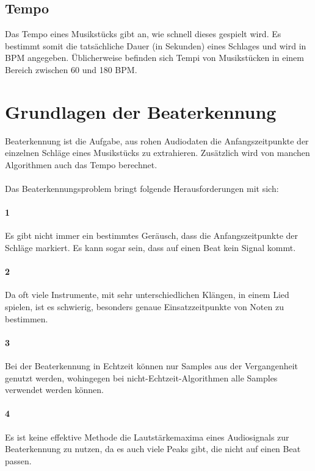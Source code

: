 {	\subsection{Tempo}
	{
		Das Tempo eines Musikstücks gibt an,
			wie schnell dieses gespielt wird.
		Es bestimmt somit die tatsächliche Dauer (in Sekunden) eines Schlages
			und wird in \ac{BPM} angegeben.
		Üblicherweise befinden sich Tempi von Musikstücken in einem Bereich zwischen 60 und 180 \ac{BPM}.
	}
}

\section{Grundlagen der Beaterkennung}
{
	Beaterkennung ist die Aufgabe,
		aus rohen Audiodaten die Anfangszeitpunkte der einzelnen Schläge eines Musikstücks zu extrahieren.
	Zusätzlich wird von manchen Algorithmen auch das Tempo berechnet.

	\paragraph{}
	{
		Das Beaterkennungsproblem bringt folgende Herausforderungen mit sich:
	}

	\paragraph{1} %
	{
		Es gibt nicht immer ein bestimmtes Geräusch,
			dass die Anfangszeitpunkte der Schläge markiert.
		Es kann sogar sein, dass auf einen Beat kein Signal kommt.
	}

	\paragraph{2} %
	{
		Da oft viele Instrumente, mit sehr unterschiedlichen Klängen, in einem Lied spielen,
			ist es schwierig,
			besonders genaue Einsatzzeitpunkte von Noten zu bestimmen.
	}

	\paragraph{3} %
	{
		Bei der Beaterkennung in Echtzeit können nur Samples aus der Vergangenheit genutzt werden,
			wohingegen bei nicht-Echtzeit-Algorithmen alle Samples verwendet werden können.
	}

	\paragraph{4} %
	{
		Es ist keine effektive Methode die Lautstärkemaxima eines Audiosignals zur Beaterkennung zu nutzen,
			da es auch viele Peaks gibt,
			die nicht auf einen Beat passen.
	}

}
